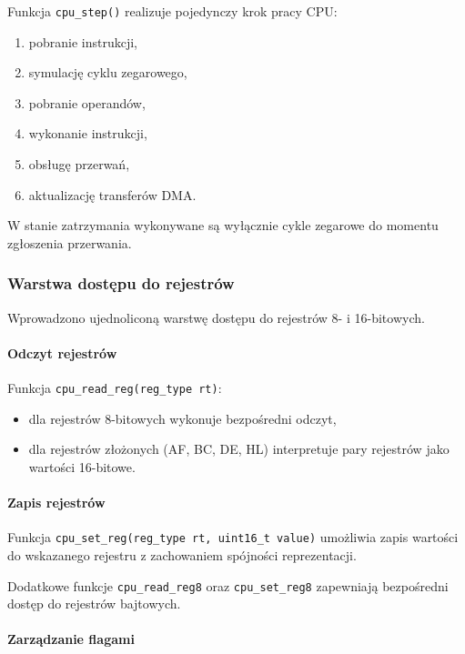 \documentclass{article}
\begin{document}
Funkcja \texttt{cpu\_step()} realizuje pojedynczy krok pracy CPU:
\begin{enumerate}
	\item pobranie instrukcji,
	\item symulację cyklu zegarowego,
	\item pobranie operandów,
	\item wykonanie instrukcji,
	\item obsługę przerwań,
	\item aktualizację transferów DMA.
\end{enumerate}

W stanie zatrzymania wykonywane są wyłącznie cykle zegarowe do momentu zgłoszenia przerwania.

\subsubsection{Warstwa dostępu do rejestrów}

Wprowadzono ujednoliconą warstwę dostępu do rejestrów 8- i 16-bitowych.

\paragraph{Odczyt rejestrów}

Funkcja \texttt{cpu\_read\_reg(reg\_type rt)}:
\begin{itemize}
	\item dla rejestrów 8-bitowych wykonuje bezpośredni odczyt,
	\item dla rejestrów złożonych (AF, BC, DE, HL) interpretuje pary rejestrów jako wartości 16-bitowe.
\end{itemize}

\paragraph{Zapis rejestrów}

Funkcja \texttt{cpu\_set\_reg(reg\_type rt, uint16\_t value)} umożliwia zapis wartości do wskazanego rejestru z zachowaniem spójności reprezentacji.

Dodatkowe funkcje \texttt{cpu\_read\_reg8} oraz \texttt{cpu\_set\_reg8} zapewniają bezpośredni dostęp do rejestrów bajtowych.

\paragraph{Zarządzanie flagami}
\end{document}
